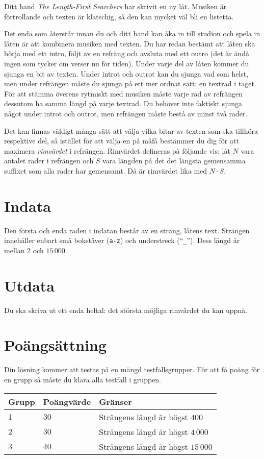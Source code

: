 Ditt band \emph{The Length-First Searchers} har skrivit en ny låt.
Musiken är förtrollande och texten är klatschig, så den kan mycket väl bli en listetta.

Det enda som återstår innan du och ditt band kan åka in till studion och spela in låten är att kombinera musiken med texten.
Du har redan bestämt att låten ska börja med ett intro, följt av en refräng och avsluta med ett outro (det är ändå ingen som tycker om verser nu för tiden).
Under varje del av låten kommer du sjunga en bit av texten.
Under introt och outrot kan du sjunga vad som helst, men under refrängen måste du sjunga på ett mer ordnat sätt: en textrad i taget.
För att stämma överens rytmiskt med musiken måste varje rad av refrängen dessutom ha samma längd på varje textrad.
Du behöver inte faktiskt sjunga något under introt och outrot, men refrängen måste bestå av minst två rader.

Det kan finnas väldigt många sätt att välja vilka bitar av texten som ska tillhöra respektive del, så istället för att välja en på måfå bestämmer du dig för att maximera \emph{rimvärdet} i refrängen.
Rimvärdet defineras på följande vis: låt $N$ vara antalet rader i refrängen och $S$ vara längden på det det längsta gemensamma suffixet som alla rader har gemensamt.
Då är rimvärdet lika med $N \cdot S$.

\section*{Indata}
Den första och enda raden i indatan består av en sträng, låtens text.
Strängen innehåller enbart små bokstäver (\texttt{a-z}) och understreck (``\texttt{\_}'').
Dess längd är mellan $2$ och $15\,000$.

\section*{Utdata}
Du ska skriva ut ett enda heltal: det största möjliga rimvärdet du kan uppnå.

\section*{Poängsättning}
Din lösning kommer att testas på en mängd testfallsgrupper.
För att få poäng för en grupp så måste du klara alla testfall i gruppen.

\noindent
\begin{tabular}{| l | l | l |}
\hline
Grupp & Poängvärde & Gränser \\ \hline
$1$   & $30$       & Strängens längd är högst $400$ \\ \hline
$2$   & $30$       & Strängens längd är högst $4\,000$ \\ \hline
$3$   & $40$       & Strängens längd är högst $15\,000$ \\ \hline
\end{tabular}
